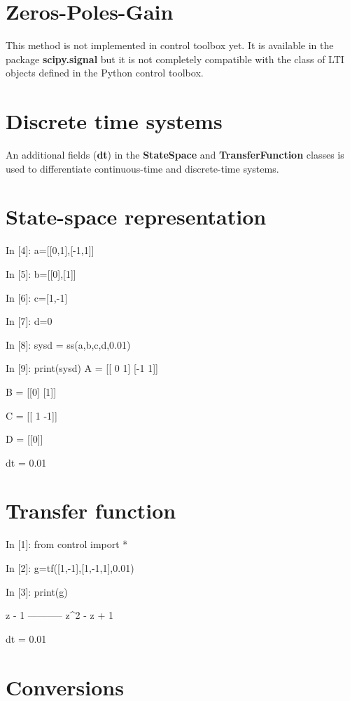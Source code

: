 \section{Zeros-Poles-Gain}
This method is not implemented in control toolbox yet. It is available in the 
package \textbf{scipy.signal} but it is not completely compatible with the 
class of LTI objects defined in the Python control toolbox.

\section{Discrete time systems}
An additional fields (\textbf{dt}) in the \textbf{StateSpace} and 
\textbf{TransferFunction} classes is used to differentiate continuous-time and 
discrete-time systems.

\section{State-space representation}
\begin{code}
In [4]: a=[[0,1],[-1,1]]

In [5]: b=[[0],[1]]

In [6]: c=[1,-1]

In [7]: d=0

In [8]: sysd = ss(a,b,c,d,0.01)

In [9]: print(sysd)
A = [[ 0  1]
 [-1  1]]

B = [[0]
 [1]]

C = [[ 1 -1]]

D = [[0]]

dt = 0.01
\end{code}


\section{Transfer function}
\begin{code}
In [1]: from control import *

In [2]: g=tf([1,-1],[1,-1,1],0.01)

In [3]: print(g)

   z - 1
-----------
z^2 - z + 1

dt = 0.01
\end{code}

\section{Conversions}

